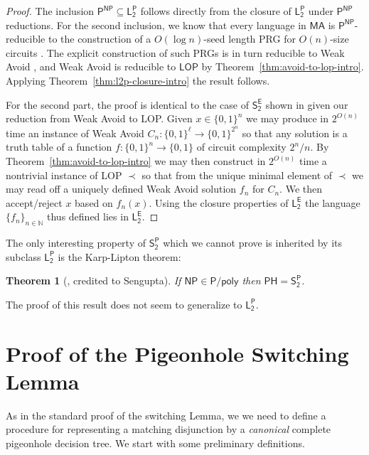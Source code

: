 \documentclass[11pt]{article}
\newtheorem*{theorem*}{Theorem}
\newcommand{\B}{\{0,1\}}
\begin{document}

\begin{proof}
The inclusion $\mathsf{P^{NP}} \subseteq \mathsf{L_2^P}$ follows directly from the closure of $\mathsf{L_2^P}$ under $\mathsf{P^{NP}}$ reductions. For the second inclusion, we know that every language in $\mathsf{MA}$ is $\mathsf{P^{NP}}$-reducible to the construction of a $O(\log n)$-seed length PRG for $O(n)$-size circuits \cite{NW}. The explicit construction of such PRGs is in turn reducible to Weak Avoid \cite{Korten}, and Weak Avoid is reducible to $\mathsf{LOP}$ by Theorem~\ref{thm:avoid-to-lop-intro}. Applying Theorem~\ref{thm:l2p-closure-intro} the result follows.

For the second part, the proof is identical to the case of $\mathsf{S_2^E}$ shown in \cite{Li} given our reduction from Weak Avoid to LOP. Given $x \in \B^n$ we may produce in $2^{O(n)}$ time an instance of Weak Avoid $C_n:\B^{\ell} \to \B^{2^n}$ so that any solution is a truth table of a function $f: \B^n \to \B$ of circuit complexity $2^n/n$. By Theorem~\ref{thm:avoid-to-lop-intro} we may then construct in $2^{O(n)}$ time a nontrivial instance of LOP $\prec$ so that from the unique minimal element of $\prec$ we may read off a uniquely defined Weak Avoid solution $f_n$ for $C_n$. We then accept/reject $x$ based on $f_n(x)$. Using the closure properties of $\mathsf{L_2^E}$ the language $\{f_n\}_{n \in \mathbb{N}}$ thus defined lies in $\mathsf{L_2^E}$.
\end{proof}

The only interesting property of $\mathsf{S_2^P}$ which we cannot prove is inherited by its subclass $\mathsf{L_2^P}$ is the Karp-Lipton theorem:
\begin{theorem*}[\cite{cai}, credited to Sengupta]\label{thm:s2p-kl}
If $\mathsf{NP} \in \mathsf{P/poly}$ then $\mathsf{PH} = \mathsf{S_2^P}$.    
\end{theorem*}
The proof of this result does not seem to generalize to $\mathsf{L_2^P}$.


\appendix
\section{Proof of the Pigeonhole Switching Lemma}
\label{sec:php-sl}
As in the standard proof of the switching Lemma, we %
we need to define a procedure for representing a matching disjunction by a {\it canonical} complete pigeonhole decision tree. We start with some preliminary definitions.
\end{document}
